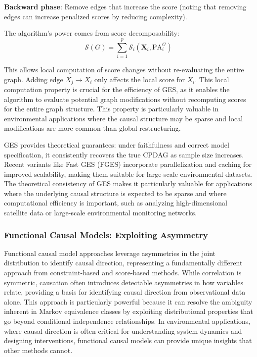 \textbf{Backward phase}: Remove edges that increase the score (noting that removing edges can increase penalized scores by reducing complexity).

The algorithm's power comes from score decomposability:
\begin{equation}
	\mathcal{S}(G) = \sum_{i=1}^{p} \mathcal{S}_i(\mathbf{X}_i, \text{PA}_i^G)
\end{equation}

This allows local computation of score changes without re-evaluating the entire graph. Adding edge $X_j \rightarrow X_i$ only affects the local score for $X_i$. This local computation property is crucial for the efficiency of GES, as it enables the algorithm to evaluate potential graph modifications without recomputing scores for the entire graph structure. This property is particularly valuable in environmental applications where the causal structure may be sparse and local modifications are more common than global restructuring.

GES provides theoretical guarantees: under faithfulness and correct model specification, it consistently recovers the true CPDAG as sample size increases. Recent variants like Fast GES (FGES) incorporate parallelization and caching for improved scalability, making them suitable for large-scale environmental datasets. The theoretical consistency of GES makes it particularly valuable for applications where the underlying causal structure is expected to be sparse and where computational efficiency is important, such as analyzing high-dimensional satellite data or large-scale environmental monitoring networks.

\subsubsection{Functional Causal Models: Exploiting Asymmetry}

Functional causal model approaches leverage asymmetries in the joint distribution to identify causal direction, representing a fundamentally different approach from constraint-based and score-based methods. While correlation is symmetric, causation often introduces detectable asymmetries in how variables relate, providing a basis for identifying causal direction from observational data alone. This approach is particularly powerful because it can resolve the ambiguity inherent in Markov equivalence classes by exploiting distributional properties that go beyond conditional independence relationships. In environmental applications, where causal direction is often critical for understanding system dynamics and designing interventions, functional causal models can provide unique insights that other methods cannot.

